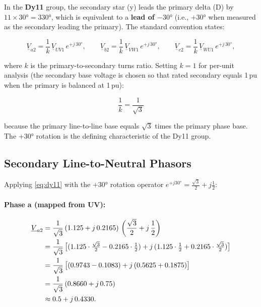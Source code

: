 \documentclass[a4paper,11pt]{article}
\begin{document}
In the \textbf{Dy11} group, the secondary star (y) leads the primary
delta (D) by $11 \times 30° = 330°$, which is equivalent to a
\textbf{lead of $-30°$} (i.e., $+30°$ when measured as the secondary
leading the primary).  The standard convention states:

\begin{equation}
\underline{V}_{a2} = \frac{1}{k}\,\underline{V}_{UV1}\,e^{+j\,30°},
\qquad
\underline{V}_{b2} = \frac{1}{k}\,\underline{V}_{VW1}\,e^{+j\,30°},
\qquad
\underline{V}_{c2} = \frac{1}{k}\,\underline{V}_{WU1}\,e^{+j\,30°},
\label{eq:dy11}
\end{equation}

where $k$ is the primary-to-secondary turns ratio.  Setting $k=1$ for
per-unit analysis (the secondary base voltage is chosen so that rated
secondary equals 1\,pu when the primary is balanced at 1\,pu):

\begin{equation}
\frac{1}{k} = \frac{1}{\sqrt{3}}
\end{equation}

because the primary line-to-line base equals $\sqrt{3}$ times the
primary phase base.  The $+30°$ rotation is the defining
characteristic of the Dy11 group.

\subsection{Secondary Line-to-Neutral Phasors}

Applying \eqref{eq:dy11} with the $+30°$ rotation operator
$e^{+j30°} = \frac{\sqrt{3}}{2} + j\frac{1}{2}$:

\paragraph{Phase a (mapped from UV):}
\begin{align}
\underline{V}_{a2} &= \frac{1}{\sqrt{3}}\,(1.125 + j\,0.2165)\,
   \left(\frac{\sqrt{3}}{2} + j\,\frac{1}{2}\right) \notag\\
&= \frac{1}{\sqrt{3}}\,
   \bigl[(1.125\cdot\tfrac{\sqrt{3}}{2} - 0.2165\cdot\tfrac{1}{2})
   + j\,(1.125\cdot\tfrac{1}{2} + 0.2165\cdot\tfrac{\sqrt{3}}{2})\bigr] \notag\\
&= \frac{1}{\sqrt{3}}\,
   \bigl[(0.9743 - 0.1083) + j\,(0.5625 + 0.1875)\bigr] \notag\\
&= \frac{1}{\sqrt{3}}\,(0.8660 + j\,0.75) \notag\\
&\approx 0.5 + j\,0.4330.
\end{align}
\end{document}
